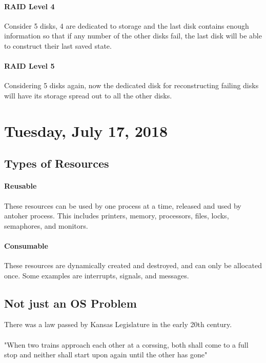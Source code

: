 \documentclass{article}
\begin{document}
\paragraph{RAID Level 4} Consider 5 disks, 4 are dedicated to storage and the last disk contains enough information so that if any number of the other disks fail, the last disk will be able to construct their last saved state.

\paragraph{RAID Level 5} Considering 5 disks again, now the dedicated disk for reconstructing failing disks will have its storage spread out to all the other disks.

\newpage


\section{Tuesday, July 17, 2018}

\subsection{Types of Resources}

\paragraph{Reusable} These resources can be used by one process at a time, released and used by antoher process. This includes printers, memory, processors, files, locks, semaphores, and monitors.

\paragraph{Consumable} These resources are dynamically created and destroyed, and can only be allocated once. Some examples are interrupts, signals, and messages.


\subsection{Not just an OS Problem}

There was a law passed by Kansas Legislature in the early 20th century.\\
\\
"When two trains approach each other at a corssing, both shall come to a full stop and neither shall start upon again until the other has gone"
\end{document}
